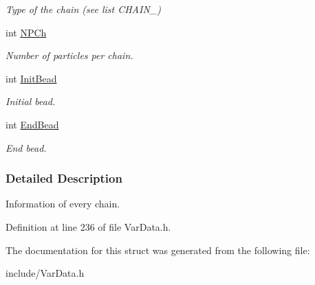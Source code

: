 \begin{DoxyCompactItemize}
\begin{DoxyCompactList}\small\item\em \-Type of the chain (see list \-C\-H\-A\-I\-N\-\_\-) \end{DoxyCompactList}\item 
\hypertarget{structCHAIN_a521663d12899e0fefe0a182332a8573f}{int \hyperlink{structCHAIN_a521663d12899e0fefe0a182332a8573f}{\-N\-P\-Ch}}\label{structCHAIN_a521663d12899e0fefe0a182332a8573f}

\begin{DoxyCompactList}\small\item\em \-Number of particles per chain. \end{DoxyCompactList}\item 
\hypertarget{structCHAIN_ae42336bc0bf033452fba9451cf1e9bc5}{int \hyperlink{structCHAIN_ae42336bc0bf033452fba9451cf1e9bc5}{\-Init\-Bead}}\label{structCHAIN_ae42336bc0bf033452fba9451cf1e9bc5}

\begin{DoxyCompactList}\small\item\em \-Initial bead. \end{DoxyCompactList}\item 
\hypertarget{structCHAIN_a3d5741424865c77e0404a26fe8d11b94}{int \hyperlink{structCHAIN_a3d5741424865c77e0404a26fe8d11b94}{\-End\-Bead}}\label{structCHAIN_a3d5741424865c77e0404a26fe8d11b94}

\begin{DoxyCompactList}\small\item\em \-End bead. \end{DoxyCompactList}\end{DoxyCompactItemize}


\subsubsection{\-Detailed \-Description}
\-Information of every chain. 

\-Definition at line 236 of file \-Var\-Data.\-h.



\-The documentation for this struct was generated from the following file\-:\begin{DoxyCompactItemize}
\item 
include/\-Var\-Data.\-h\end{DoxyCompactItemize}
